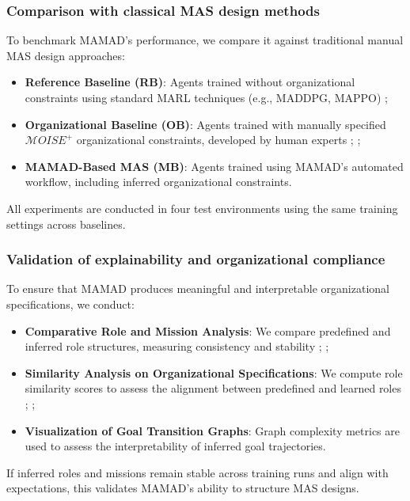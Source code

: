 \documentclass[pdflatex,sn-mathphys-num]{sn-jnl}%
\theoremstyle{thmstyleone}%
\theoremstyle{thmstyletwo}%
\theoremstyle{thmstylethree}%
\begin{document}
\subsubsection{Comparison with classical MAS design methods}
To benchmark MAMAD's performance, we compare it against traditional manual MAS design approaches:
\begin{itemize}
    \item \textbf{Reference Baseline (RB)}: Agents trained without organizational constraints using standard MARL techniques (e.g., MADDPG, MAPPO) ;
    \item \textbf{Organizational Baseline (OB)}: Agents trained with manually specified $\mathcal{M}OISE^+$ organizational constraints, developed by human experts ; ;
    \item \textbf{MAMAD-Based MAS (MB)}: Agents trained using MAMAD's automated workflow, including inferred organizational constraints.
\end{itemize}

All experiments are conducted in four test environments using the same training settings across baselines.

\subsubsection{Validation of explainability and organizational compliance}
To ensure that MAMAD produces meaningful and interpretable organizational specifications, we conduct:
\begin{itemize}
    \item \textbf{Comparative Role and Mission Analysis}: We compare predefined and inferred role structures, measuring consistency and stability ; ;
    \item \textbf{Similarity Analysis on Organizational Specifications}: We compute role similarity scores to assess the alignment between predefined and learned roles ; ;
    \item \textbf{Visualization of Goal Transition Graphs}: Graph complexity metrics are used to assess the interpretability of inferred goal trajectories.
\end{itemize}

If inferred roles and missions remain stable across training runs and align with expectations, this validates MAMAD's ability to structure MAS designs.
\end{document}
